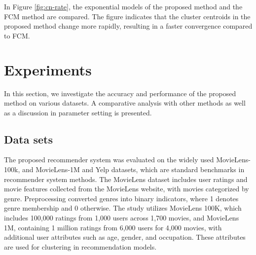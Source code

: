 \documentclass{article}
\begin{document}
In Figure \ref{fig:cn-rate}, the exponential models of the proposed method and the FCM method are compared. The figure indicates that the cluster centroids in the proposed method change more rapidly, resulting in a faster convergence compared to FCM.
























































\section{Experiments}
In this section, we investigate the accuracy and performance of the proposed method on various datasets. A comparative analysis with other methods as well as a discussion in parameter setting  is presented.

\subsection{Data sets}
The proposed recommender system was evaluated on the widely used MovieLens-100k, and MovieLens-1M and Yelp datasets, which are standard benchmarks in recommender system methods.
The MovieLens dataset includes user ratings and movie features collected from the MovieLens website, with movies categorized by genre. Preprocessing converted genres into binary indicators, where 1 denotes genre membership and 0 otherwise. The study utilizes MovieLens 100K, which includes 100,000 ratings from 1,000 users across 1,700 movies, and MovieLens 1M, containing 1 million ratings from 6,000 users for 4,000 movies, with additional user attributes such as age, gender, and occupation. These attributes are used for clustering in recommendation models.
\end{document}
